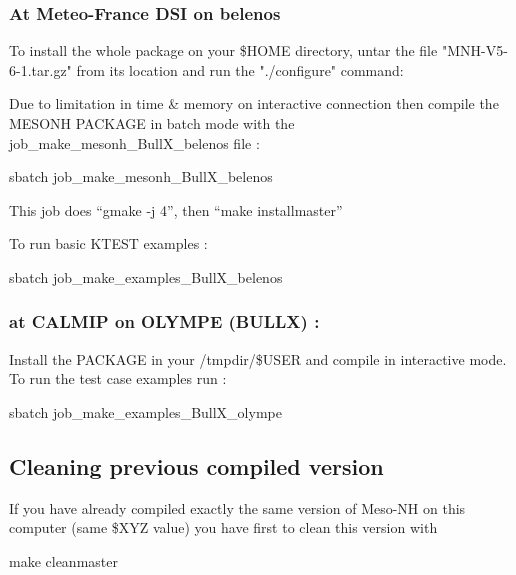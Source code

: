\subsubsection{At Meteo-France DSI on belenos}

To install the whole package on your \$HOME directory, untar the file "MNH-V5-6-1.tar.gz" from its location and run the "./configure" command:

Due to limitation in time & memory on interactive connection then compile the MESONH PACKAGE in batch mode with the job\_make\_mesonh\_BullX\_belenos file :
\begin{bashcode}
sbatch job_make_mesonh_BullX_belenos
\end{bashcode}

This job does ``gmake -j 4'', then ``make installmaster''

To run basic KTEST examples :
\begin{bashcode}
sbatch job_make_examples_BullX_belenos
\end{bashcode}
 
\subsubsection{at CALMIP on OLYMPE (BULLX)  :}

Install the PACKAGE in your /tmpdir/\$USER and compile in interactive mode. \\

To run the test case examples  run :
\begin{bashcode}
sbatch job_make_examples_BullX_olympe
\end{bashcode}

\subsection{Cleaning previous compiled version}

If you have already compiled exactly the same version of Meso-NH on this computer (same \$XYZ value) you have first to clean this version with
\begin{bashcode}
make cleanmaster
\end{bashcode}


